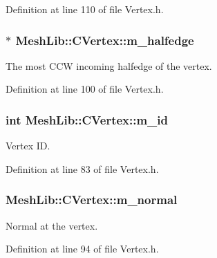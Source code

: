 Definition at line 110 of file Vertex.\+h.

\subsubsection[{\texorpdfstring{m\+\_\+halfedge}{m_halfedge}}]{$\ast$ Mesh\+Lib\+::\+C\+Vertex\+::m\+\_\+halfedge\hspace{0.3cm}{\ttfamily [protected]}}\hypertarget{class_mesh_lib_1_1_c_vertex_a322a95750dc442c4559ef180d35a6074}{}\label{class_mesh_lib_1_1_c_vertex_a322a95750dc442c4559ef180d35a6074}
The most C\+CW incoming halfedge of the vertex. 

Definition at line 100 of file Vertex.\+h.

\subsubsection[{\texorpdfstring{m\+\_\+id}{m_id}}]{\setlength{\rightskip}{0pt plus 5cm}int Mesh\+Lib\+::\+C\+Vertex\+::m\+\_\+id\hspace{0.3cm}{\ttfamily [protected]}}\hypertarget{class_mesh_lib_1_1_c_vertex_a686d33c96343be3d7b9c46b628061bd9}{}\label{class_mesh_lib_1_1_c_vertex_a686d33c96343be3d7b9c46b628061bd9}
Vertex ID. 

Definition at line 83 of file Vertex.\+h.

\subsubsection[{\texorpdfstring{m\+\_\+normal}{m_normal}}]{ Mesh\+Lib\+::\+C\+Vertex\+::m\+\_\+normal\hspace{0.3cm}{\ttfamily [protected]}}\hypertarget{class_mesh_lib_1_1_c_vertex_aa313fb31475b4951f50e50f141cec0fc}{}\label{class_mesh_lib_1_1_c_vertex_aa313fb31475b4951f50e50f141cec0fc}
Normal at the vertex. 

Definition at line 94 of file Vertex.\+h.

